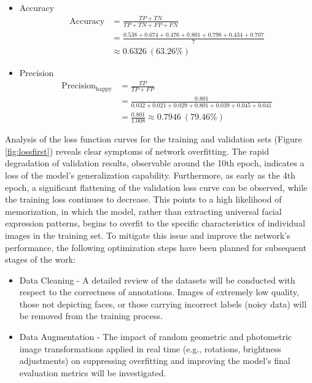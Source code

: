 \documentclass{article}
\begin{document}
\begin{itemize}
    \item Accuracy 
    \begin{align*}
        \text{Accuracy} &= \frac{TP+TN}{TP+TN+FP+FN} \\&= \frac{0.538 + 0.674 + 0.476 + 0.801 + 0.798 + 0.434 + 0.707}{7} \\
        &\approx 0.6326 \ (63.26\%)
    \end{align*}

    \item Precision 
    \begin{align*}
        \text{Precision}_{\text{happy}} &= \frac{TP}{TP + FP} \\
        &= \frac{0.801}{0.032 + 0.021 + 0.029 + 0.801 + 0.039 + 0.045 + 0.041} \\
        &= \frac{0.801}{1.008} \approx 0.7946 \ (79.46\%)
    \end{align*}
\end{itemize}
Analysis of the loss function curves for the training and validation sets (Figure \ref{fig:lossfirst}) reveals clear symptoms of network overfitting. The rapid degradation of validation results, observable around the 10th epoch, indicates a loss of the model's generalization capability. Furthermore, as early as the 4th epoch, a significant flattening of the validation loss curve can be observed, while the training loss continues to decrease. This points to a high likelihood of memorization, in which the model, rather than extracting universal facial expression patterns, begins to overfit to the specific characteristics of individual images in the training set.
To mitigate this issue and improve the network's performance, the following optimization steps have been planned for subsequent stages of the work:
\begin{itemize}
    \item Data Cleaning - A detailed review of the datasets will be conducted with respect to the correctness of annotations. Images of extremely low quality, those not depicting faces, or those carrying incorrect labels (noisy data) will be removed from the training process.
    \item Data Augmentation - The impact of random geometric and photometric image transformations applied in real time (e.g., rotations, brightness adjustments) on suppressing overfitting and improving the model's final evaluation metrics will be investigated.
\end{itemize}
\end{document}
